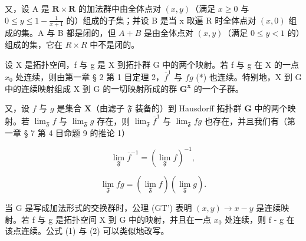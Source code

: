 又，设 A 是 \(\mathbf{R} \times \mathbf{R}\) 的加法群中由全体点对 \((x, y)\)（满足 \(x \geqslant 0\) 与 \(0 \leqslant y \leqslant 1 - \frac{1}{x + 1}\) 的）组成的子集；并设 B 是当 x 取遍 R 时全体点对 \((x,0)\) 组成的集。A 与 B 都是闭的，但 \(A + B\) 是由全体点对 \((x,y)\)（满足 \(0 \leqslant y < 1\) 的）组成的集，它在 \(R \times R\) 中不是闭的。

设 X 是拓扑空间，f 与 g 是 X 到拓扑群 G 中的两个映射。若 f 与 g 在 X 的一点 \(x_{0}\) 处连续，则由第一章 § 2 第 1 目定理 2，\(\overline{f}^{1}\) 与 \(fg\) (*) 也连续。特别地，X 到 G 中的连续映射组成 X 到 G 的一切映射所成的群 \(\mathbf{G}^{\mathbf{x}}\) 的一个子群。

又，设 \(f\) 与 \(g\) 是集合 \(\mathbf{X}\)（由滤子 \(\mathfrak{F}\) 装备的）到 Hausdorff 拓扑群 \(\mathbf{G}\) 中的两个映射。若 \(\lim_{\mathfrak{F}} f\) 与 \(\lim_{\mathfrak{F}} g\) 存在，则 \(\lim_{\mathfrak{F}} \overline{f}^1\) 与 \(\lim_{\mathfrak{F}} fg\) 也存在，并且我们有（第一章 § 7 第 4 目命题 9 的推论 1）

\[
\lim _ {\mathfrak {F}} \overline {{f}} ^ {- 1} = (\lim _ {\mathfrak {F}} f) ^ {- 1},\tag{1}
\]

\[
\lim _ {\mathfrak {F}} f g = (\lim _ {\mathfrak {F}} f) (\lim _ {\mathfrak {F}} g).\tag{2}
\]

当 G 是写成加法形式的交换群时，公理 (GT') 表明 \((x, y) \to x - y\) 是连续映射。若 f 与 g 是拓扑空间 X 到 G 中的映射，并且在一点 \(x_{0}\) 处连续，则 f - g 在该点连续。公式 (1) 与 (2) 可以类似地改写。
